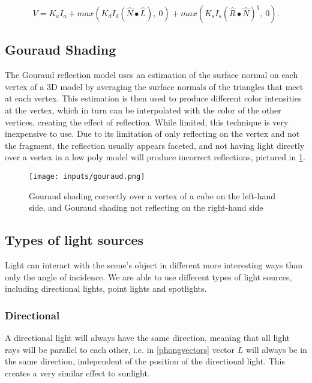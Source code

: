 \documentclass[cic,tc,english]{iiufrgs}
\begin{document}
\begin{equation}
    V = K_a I_a + max(K_d I_d (\hat N \bullet \hat L),\ 0) + max(K_s I_s(\hat R \bullet \hat N)^q,\ 0).
    \label{phongequation}
\end{equation}

\subsection{Gouraud Shading}

The Gouraud reflection model uses an estimation of the surface normal on each vertex of a 3D model by averaging the surface normals of the triangles that meet at each vertex. This estimation is then used to produce different color intensities at the vertex, which in turn can be interpolated with the color of the other vertices, creating the effect of reflection. While limited, this technique is very inexpensive to use. Due to its limitation of only reflecting on the vertex and not the fragment, the reflection usually appears faceted, and not having light directly over a vertex in a low poly model will produce incorrect reflections, pictured in \cref{Gourauderror}.

\begin{figure}[hbt!]
    \caption{Gouraud shading correctly over a vertex of a cube on the left-hand side, and Gouraud shading not reflecting on the right-hand side}
    \begin{center}
        \texttt{[image: inputs/gouraud.png]}
    \end{center}
    \label{Gourauderror}
\end{figure}

\subsection{Types of light sources}
\label{typesoflightprojection}
Light can interact with the scene's object in different more interesting ways than only the angle of incidence. We are able to use different types of light sources, including directional lights, point lights and spotlights.

\subsubsection{Directional}
A directional light will always have the same direction, meaning that all light rays will be parallel to each other, i.e. in \cref{phongvectors} vector $L$ will always be in the same direction, independent of the position of the directional light. This creates a very similar effect to sunlight.
\end{document}
